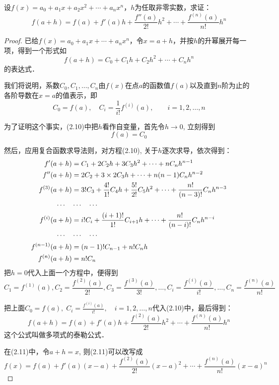 \begin{example}
设$f(x)=a_0+a_1x+a_2x^2+\cdots+a_nx^n$，$h$为任取非零实数，求证：
\[f(a+h)=f(a)+f'(a)h+\frac{f''(a)}{2!}h^2+\cdots+\frac{f^{(n)}(a)}{n!}h^n\]
\end{example}


\begin{proof}
已给$f(x)=a_0+a_1x+\cdots+a_nx^n$，令$x=a+h$，并按$h$的升幂展开每一项，得到一个形式如
\begin{equation}
    f(a+h)=C_0+C_1 h+C_2 h^2+\cdots +C_n h^n
\end{equation}
的表达式．

我们将说明，系数$C_0,C_1,\ldots,C_n$由$f(x)$在点$a$的函数值$f(a)$以及直到$n$阶为止的各阶导数在$x=a$的值表示，即
\[C_0=f (a) ,\quad  C_i =\frac{1}{i!}f^{(i)} (a) ,\qquad i=1, 2,\ldots ,n\]

为了证明这个事实，(2.10)中把$h$看作自变量，首先令$h\to 0$, 立刻得到
\[f (a) =C_0\]

然后，应用复合函数求导法则，对方程(2.10), 关于$h$逐次求导，依次得到：
\begin{align*}
f'(a+h)&=C_1+2C_2 h+3C_3h^2+\cdots +nC_nh^{n-1}\\
f''(a+h)&=2C_2+3\times 2C_3h+\cdots+n(n-1)C_nh^{n-2}\\
f^{(3)}(a+h)&=3!C_3+\dfrac{4!}{1!}C_4h+\dfrac{5!}{2!}C_5h^2+\cdots+\dfrac{n!}{(n-3)!}C_nh^{n-3}\\
\cdots\quad &\cdots\quad \cdots\\
f^{(i)}(a+h)&=i! C_i+\dfrac{(i+1)!}{1!}C_{i+1}h+\cdots+\dfrac{n!}{(n-i)!}C_nh^{n-i}\\
\cdots\quad &\cdots\quad \cdots\\
f^{(n-1)}(a+h)&=(n-1)!C_{n-1}+n!C_nh\\
f^{(n)}(a+h)&=n!C_n
\end{align*}
把$h=0$代入上面一个方程中，便得到
\[C_1=f^{(1)}(a),C_2=\frac{f^{(2)}(a)}{2!},C_3=\frac{f^{(3)}(a)}{3!},\ldots,C_i=\frac{f^{(i)}(a)}{i!},\ldots,C_n=\frac{f^{(n)}(a)}{n!}\]

把上面$C_0=f(a),\; C_i=\frac{f^{(i)}(a)}{i!},\quad i=1,2,\ldots,n$代入(2.10)中，最后得到：
\begin{equation}
    f(a+h)=f(a)+f'(a)h+\frac{f^{(2)}(a)}{2!}h^2+\cdots+\frac{f^{(n)}(a)}{n!}h^n
\end{equation}
这个公式叫做多项式的泰勒公式．

在(2.11)中，令$a+h=x$, 则(2.11)可以改写成
\[    f(x)=f(a)+f'(a)(x-a)+\frac{f^{(2)}(a)}{2!}(x-a)^2+\cdots+\frac{f^{(n)}(a)}{n!}(x-a)^n\]
\end{proof}

